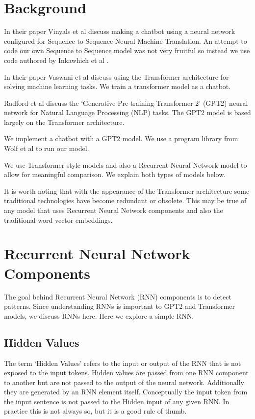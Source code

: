 
\section{Background}

In their paper Vinyals et al \cite{DBLP:journals/corr/VinyalsL15} discuss making a chatbot using a neural network configured for Sequence to Sequence Neural Machine Translation. An attempt to code our own Sequence to Sequence model was not very fruitful so instead we use code authored by Inkawhich et al \cite{2018Inkawhich}.

In their paper Vaswani et al \cite{Vaswani2017AttentionIA} discuss using the Transformer architecture for solving machine learning tasks. We train a transformer model as a chatbot. 

Radford et al \cite{radford2019language} discuss the `Generative Pre-training Transformer 2' (GPT2) neural network for Natural Language Processing (\ac{NLP}) tasks. The GPT2 model is based largely on the Transformer architecture. 

We implement a chatbot with a GPT2 model. We use a program library from Wolf et al \cite{Wolf2019HuggingFacesTS} to run our model.

We use Transformer style models and also a Recurrent Neural Network model to allow for meaningful comparison. We explain both types of models below.

It is worth noting that with the appearance of the Transformer architecture some traditional technologies have become redundant or obsolete. This may be true of any model that uses Recurrent Neural Network components and also the traditional word vector embeddings.

\section{Recurrent Neural Network Components}

The goal behind Recurrent Neural Network (RNN) components is to detect patterns. Since understanding RNNs is important to GPT2 and Transformer models, we discuss RNNs here. Here we explore a simple \ac{RNN}.%

\subsection{Hidden Values}
The term `Hidden Values' refers to the input or output of the RNN that is not exposed to the input tokens. Hidden values are passed from one RNN component to another but are not passed to the output of the neural network. Additionally they are generated by an RNN element itself. Conceptually the input token from the input sentence is not passed to the Hidden input of any given RNN. In practice this is not always so, but it is a good rule of thumb.


